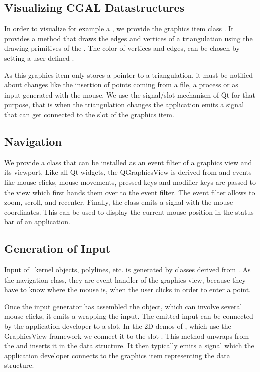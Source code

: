 \subsection{Visualizing CGAL Datastructures}

In order to visualize for example a , we
provide the graphics item class .
It provides a  method that draws the edges and vertices of a triangulation
using the drawing primitives of the .   The color of vertices and edges, 
can be chosen by setting a user defined  .


As this graphics item only stores a pointer to a triangulation, it
must be notified about changes like the insertion of points coming from
a file, a process or as input generated with the mouse.  We
use the signal/slot mechanism of Qt for that purpose, that is when the
triangulation changes the application emits a signal that can get connected to the
 slot of the graphics item.



\subsection{Navigation}

We provide a class  that can be
installed as an event filter of a graphics view and its viewport. Like
all Qt widgets, the {QGraphicsView} is derived from
 and events like mouse clicks, mouse movements, pressed keys and 
modifier keys are passed to the view which first hands them over to the
event filter.  The  event filter allows to zoom, scroll, and recenter.
Finally, the class emits a signal with the mouse coordinates. This can be used
to display the current mouse position in the status bar of an application.

\subsection{Generation of Input}

Input of \cgal\ kernel objects, polylines, etc. is generated by classes derived
from .  As the navigation class, they are event handler of the
graphics view, because they have to know where the mouse is, when the user clicks
in order to enter a point.

Once the input generator has assembled the object, which can involve several mouse clicks,
it emits a  wrapping the input.  The emitted input can be connected
by the application developer to a slot. In the 2D demos of \cgal, which use the 
GraphicsView framework we connect it to the slot .
This method unwraps from the  and inserts it in the data structure. 
It then typically emits a signal  which the application developer 
connects to the graphics item representing the data structure.

